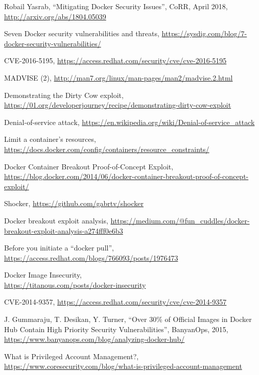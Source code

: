 \documentclass[a4paper,12pt]{article}
\begin{document}
\begin{thebibliography}{99}
Robail Yasrab, 
``Mitigating Docker Security Issues'', 
CoRR,
April 2018,
\url{http://arxiv.org/abs/1804.05039}

Seven Docker security vulnerabilities and threats,
\url{https://sysdig.com/blog/7-docker-security-vulnerabilities/}

CVE-2016-5195, \url{https://access.redhat.com/security/cve/cve-2016-5195} 

MADVISE (2), \url{http://man7.org/linux/man-pages/man2/madvise.2.html}

Demonstrating the Dirty Cow exploit,
\url{https://01.org/developerjourney/recipe/demonstrating-dirty-cow-exploit}

Denial-of-service attack,
\url{https://en.wikipedia.org/wiki/Denial-of-service_attack}

Limit a container's resources,
\url{https://docs.docker.com/config/containers/resource_constraints/}

Docker Container Breakout Proof-of-Concept Exploit,
\url{https://blog.docker.com/2014/06/docker-container-breakout-proof-of-concept-exploit/}

Shocker, \url{https://github.com/gabrtv/shocker}

Docker breakout exploit analysis,
\url{https://medium.com/@fun_cuddles/docker-breakout-exploit-analysis-a274fff0e6b3}

Before you initiate a ``docker pull'',
\url{https://access.redhat.com/blogs/766093/posts/1976473}

Docker Image Insecurity, \\ \url{https://titanous.com/posts/docker-insecurity}

CVE-2014-9357, \url{https://access.redhat.com/security/cve/cve-2014-9357}

J. Gummaraju, T. Desikan, Y. Turner, 
``Over 30\% of Official Images in Docker Hub Contain High Priority Security
Vulnerabilities'', 
BanyanOps, 
2015,
\url{ https://www.banyanops.com/blog/analyzing-docker-hub/}

What is Privileged Account Management?,
\url{https://www.coresecurity.com/blog/what-is-privileged-account-management}


\end{thebibliography}
\end{document}
